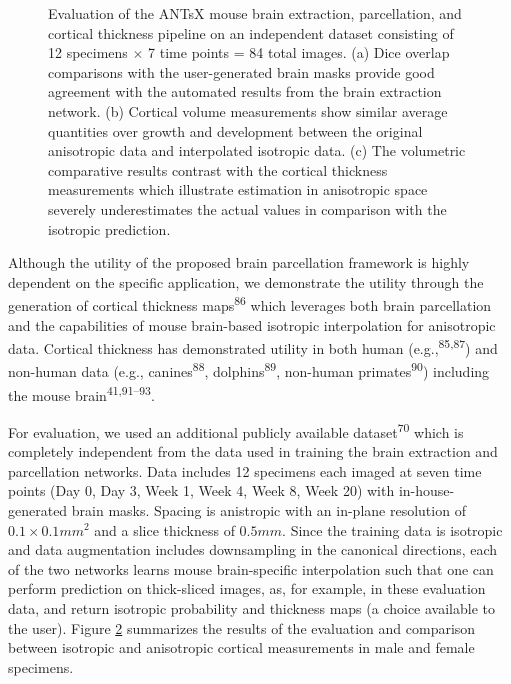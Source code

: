 \documentclass[
  12pt,
]{article}
\begin{document}
\begin{figure}
\begin{subfigure}{.5\textwidth}
  \caption{}
  \label{fig:subc}
\end{subfigure}
\caption{Evaluation of the ANTsX mouse brain extraction, parcellation, and
cortical thickness pipeline on an independent dataset consisting of 12 specimens
$\times$ 7 time points = 84 total images.  (a) Dice overlap comparisons with the
user-generated brain masks provide good agreement with the automated results
from the brain extraction network. (b) Cortical volume measurements show similar
average quantities over growth and development between the original anisotropic
data and interpolated isotropic data.  (c) The volumetric comparative results
contrast with the cortical thickness measurements which illustrate estimation in
anisotropic space severely underestimates the actual values in comparison with
the isotropic prediction.}
\label{fig:evaluation}
\end{figure}

Although the utility of the proposed brain parcellation framework is
highly dependent on the specific application, we demonstrate the utility
through the generation of cortical thickness maps\textsuperscript{86}
which leverages both brain parcellation and the capabilities of mouse
brain-based isotropic interpolation for anisotropic data. Cortical
thickness has demonstrated utility in both human
(e.g.,\textsuperscript{85,87}) and non-human data (e.g.,
canines\textsuperscript{88}, dolphins\textsuperscript{89}, non-human
primates\textsuperscript{90}) including the mouse
brain\textsuperscript{41,91--93}.

For evaluation, we used an additional publicly available
dataset\textsuperscript{70} which is completely independent from the
data used in training the brain extraction and parcellation networks.
Data includes 12 specimens each imaged at seven time points (Day 0, Day
3, Week 1, Week 4, Week 8, Week 20) with in-house-generated brain masks.
Spacing is anistropic with an in-plane resolution of
\(0.1 \times 0.1 mm^2\) and a slice thickness of \(0.5 mm\). Since the
training data is isotropic and data augmentation includes downsampling
in the canonical directions, each of the two networks learns mouse
brain-specific interpolation such that one can perform prediction on
thick-sliced images, as, for example, in these evaluation data, and
return isotropic probability and thickness maps (a choice available to
the user). Figure \ref{fig:evaluation} summarizes the results of the
evaluation and comparison between isotropic and anisotropic cortical
measurements in male and female specimens.
\end{document}
